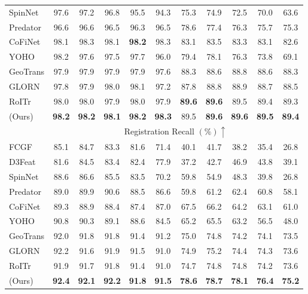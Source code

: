 \begin{table}[t]
{{\begin{tabular}{l | c c c c c | c c c c c}
			SpinNet \cite{ao2021spinnet} 	& 97.6 & 97.2 & 96.8 & 95.5 & 94.3 & 75.3 & 74.9 & 72.5 & 70.0 & 63.6 \\
			Predator\cite{huang2021predator} & 96.6 & 96.6 & 96.5 & 96.3 & 96.5 & 78.6 & 77.4 & 76.3 & 75.7 & 75.3\\
			CoFiNet\cite{yu2021cofinet}	& 98.1 & 98.3 & 98.1 & \bf98.2 & 98.3 & 83.1 & 83.5 & 83.3 & 83.1 & 82.6\\
			YOHO\cite{wang2022you} 		& 98.2 & 97.6 & 97.5 & 97.7 & 96.0 & 79.4 & 78.1 & 76.3 & 73.8 & 69.1\\
			GeoTrans\cite{qin2022geometric} & 97.9 & 97.9 & 97.9 & 97.9 & 97.6 & 88.3 & 88.6 & 88.8 & 88.6 & 88.3 \\
                GLORN \cite{xu2022glorn} & 97.8 & 97.9 & 98.0 & 98.1 & 97.2 & 87.8 & 88.8 & 88.9 & 88.7 & 88.5 \\
                RoITr~\cite{yu2023rotation} & 98.0 & 98.0 & 97.9 & 98.0 & 97.9 & \bf89.6 & \bf89.6 & 89.5 & 89.4 & 89.3 \\
			\ourmethod(Ours)  & \bf98.2 & \bf98.2 & \bf98.1 & \bf98.2 & \bf98.3 & 89.5 & \bf89.6 & \bf89.6 & \bf89.5 & \bf89.4 \\
			\hline
			& \multicolumn{10}{c}{Registration Recall $(\%) \uparrow$} \\
			\hline
			FCGF\cite{choy2019fully} 	& 85.1 & 84.7 & 83.3 & 81.6 & 71.4 & 40.1 & 41.7 & 38.2 & 35.4 & 26.8 \\
			D3Feat\cite{bai2020d3feat} 	& 81.6 & 84.5 & 83.4 & 82.4 & 77.9 & 37.2 & 42.7 & 46.9 & 43.8 & 39.1 \\
			SpinNet\cite{ao2021spinnet} & 88.6 & 86.6 & 85.5 & 83.5 & 70.2 & 59.8 & 54.9 & 48.3 & 39.8 & 26.8 \\
			Predator\cite{huang2021predator} 	& 89.0 & 89.9 & 90.6 & 88.5 & 86.6 & 59.8 & 61.2 & 62.4 & 60.8 & 58.1 \\
			CoFiNet\cite{yu2021cofinet}	  & 89.3 & 88.9 & 88.4 & 87.4 & 87.0 & 67.5 & 66.2 & 64.2 & 63.1 & 61.0 \\
			YOHO \cite{wang2022you} 	  & 90.8 & 90.3 & 89.1 & 88.6 & 84.5 & 65.2 & 65.5 & 63.2 & 56.5 & 48.0 \\
			GeoTrans\cite{qin2022geometric} & 92.0 & 91.8 & 91.8 & 91.4 & 91.2 & 75.0 & 74.8 & 74.2 & 74.1 & 73.5 \\
            GLORN \cite{xu2022glorn} & 92.2 & 91.6 & 91.9 & 91.5 & 91.0 & 74.9 & 75.2 & 74.4 & 74.3 & 73.6 \\
            RoITr~\cite{yu2023rotation} & 91.9 & 91.7 & 91.8 & 91.4 & 91.0 & 74.7 & 74.8 & 74.8 & 74.2 & 73.6 \\
			\ourmethod(Ours) & \bf92.4 & \bf92.1 & \bf92.2 & \bf91.8 & \bf91.5 & \bf78.6 & \bf78.7 & \bf78.1 & \bf76.4 & \bf75.2 \\
			\bottomrule
		\end{tabular}
	}}
	\label{table:3dm}
 \vspace{-0.4cm}
\end{table}




